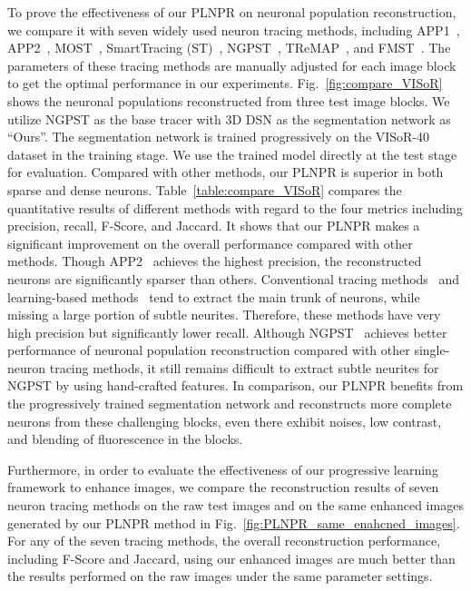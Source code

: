 To prove the effectiveness of our PLNPR on neuronal population reconstruction, we compare it with seven widely used neuron tracing methods, including APP1~\cite{Peng2011},  APP2~\cite{Xiao2013}, MOST~\cite{Wu2014}, SmartTracing (ST)~\cite{Chen2015}, NGPST~\cite{Quan2015}, TReMAP~\cite{Zhou2016}, and  FMST~\cite{Yang2019}.
The parameters of these tracing methods are manually adjusted for each image block to get the optimal performance in our experiments.
%
Fig.~\ref{fig:compare_VISoR} shows the neuronal populations reconstructed from three test image blocks.
We utilize NGPST as the base tracer with 3D DSN as the segmentation network as ``Ours''. 
The segmentation network is trained progressively on the VISoR-40 dataset in the training stage. 
We use the trained model directly at the test stage for evaluation. 
Compared with other methods, our PLNPR is superior in both sparse and dense neurons.
%
Table~\ref{table:compare_VISoR} compares the quantitative results of different methods with regard to the four metrics including precision, recall, F-Score, and Jaccard.
%
It shows that our PLNPR makes a significant improvement on the overall performance compared with other methods.
Though APP2~\cite{Xiao2013} achieves the highest precision, the reconstructed neurons are significantly sparser than others.
%
Conventional tracing methods~\cite{Peng2011, Xiao2013, Wu2014, Zhou2016} and learning-based methods~\cite{Chen2015, Yang2019} tend to extract the main trunk of neurons, while missing a large portion of subtle neurites. 
Therefore, these methods have very high precision but significantly lower recall.
Although NGPST~\cite{Quan2015} achieves better performance of neuronal population reconstruction compared with other single-neuron tracing methods, it still remains difficult to extract subtle neurites for NGPST by using hand-crafted features.
%
In comparison, our PLNPR benefits from the progressively trained segmentation network and reconstructs more complete neurons from these challenging blocks, even there exhibit noises, low contrast, and blending of fluorescence in the blocks.
%


Furthermore, in order to evaluate the effectiveness of our progressive learning framework to enhance images, we compare the reconstruction results of seven neuron tracing methods on the raw test images and on the same enhanced images generated by our PLNPR method in Fig.~\ref{fig:PLNPR_same_enahcned_images}.
For any of the seven tracing methods, the overall reconstruction performance, including F-Score and Jaccard, using our enhanced images are much better than the results performed on the raw images under the same parameter settings.

